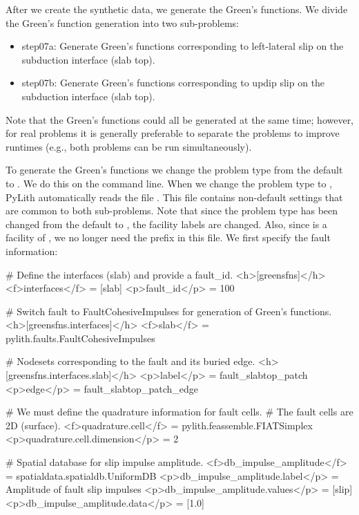 After we create the synthetic data, we generate the Green's
functions. We divide the Green's function generation into two sub-problems:
\begin{itemize}
 \item step07a:  Generate Green's functions corresponding to
   left-lateral slip on the subduction interface (slab top).
 \item step07b:  Generate Green's functions corresponding to
   updip slip on the subduction interface (slab top).
\end{itemize}
Note that the Green's functions could all be generated at the same
time; however, for real problems it is generally preferable to
separate the problems to improve runtimes (e.g., both problems can be
run simultaneously).

To generate the Green's functions we change the problem type from the
default  to . We do this
on the command line. When we change the problem type to
, PyLith automatically reads the file
. This file contains non-default settings that
are common to both sub-problems. Note that since the problem type has
been changed from the default  to
, the facility labels are changed. Also, since
 is a facility of , we no longer
need the  prefix in this file. We first specify
the fault information:
\begin{cfg}
# Define the interfaces (slab) and provide a fault_id.
<h>[greensfns]</h>
<f>interfaces</f> = [slab]
<p>fault_id</p> = 100

# Switch fault to FaultCohesiveImpulses for generation of Green's functions.
<h>[greensfns.interfaces]</h>
<f>slab</f> = pylith.faults.FaultCohesiveImpulses

# Nodesets corresponding to the fault and its buried edge.
<h>[greensfns.interfaces.slab]</h>
<p>label</p> = fault_slabtop_patch
<p>edge</p> = fault_slabtop_patch_edge

# We must define the quadrature information for fault cells.
# The fault cells are 2D (surface).
<f>quadrature.cell</f> = pylith.feassemble.FIATSimplex
<p>quadrature.cell.dimension</p> = 2

# Spatial database for slip impulse amplitude.
<f>db_impulse_amplitude</f> = spatialdata.spatialdb.UniformDB
<p>db_impulse_amplitude.label</p> = Amplitude of fault slip impulses
<p>db_impulse_amplitude.values</p> = [slip]
<p>db_impulse_amplitude.data</p> = [1.0]
\end{cfg}

